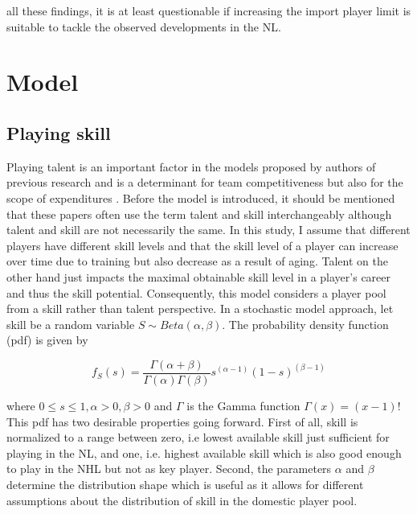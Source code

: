 \documentclass[12pt, a4paper]{article}
\begin{document}
all these findings, it is at least questionable if increasing the import player limit is suitable to tackle the observed developments in the NL. 

\section{Model} 
\subsection{Playing skill}
\label{playingSkill}

Playing talent is an important factor in the models proposed by authors of previous research and is a determinant for team competitiveness but also for the scope of expenditures \citep[see e.g.][]{dietl_effect_2009,el-hodiri_economic_1971,fort_cross-subsidization_1995,kesenne_impact_2000,whitney_bidding_1993}. Before the model is introduced, it should be mentioned that these papers often use the term talent and skill interchangeably although talent and skill are not necessarily the same. In this study, I assume that different players have different skill levels and that the skill level of a player can increase over time due to training but also decrease as a result of aging. Talent on the other hand just impacts the maximal obtainable skill level in a player's career and thus the skill potential. Consequently, this model considers a player pool from a skill rather than talent perspective. In a stochastic model approach, let skill be a random variable $S\sim Beta(\alpha,\beta)$. The probability density function (pdf) is given by 

\begin{equation}
f_S(s)=\frac{\Gamma(\alpha+\beta)}{\Gamma(\alpha)\Gamma(\beta)}s^{(\alpha-1)}(1-s)^{(\beta-1)}
\end{equation}

\noindent 
where $0 \leq s \leq 1,\alpha > 0,\beta > 0$ and $\Gamma$ is the Gamma function ${\Gamma(x)=(x-1)!}$ This pdf has two desirable properties going forward. First of all, skill is normalized to a range between zero, i.e lowest available skill just sufficient for playing in the NL, and one, i.e. highest available skill which is also good enough to play in the NHL but not as key player. Second, the parameters $\alpha$ and $\beta$ determine the distribution shape which is useful as it allows for different assumptions about the distribution of skill in the domestic player pool. 
\end{document}
